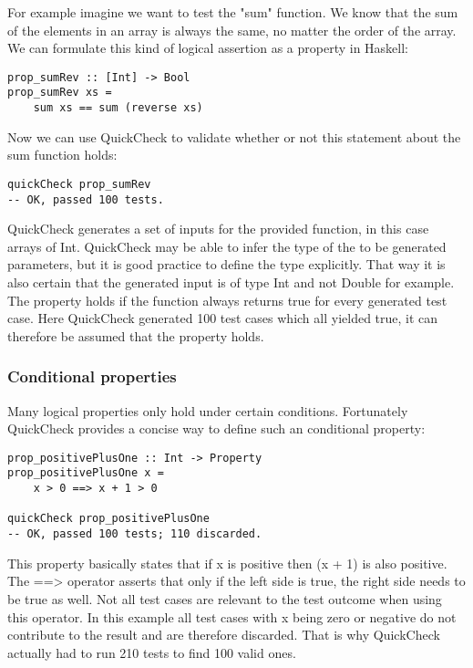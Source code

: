 \documentclass[a4paper, 12pt]{article} %
\begin{document}
For example imagine we want to test the "sum" function. We know that the sum of the elements in an array is always the same, no matter the order of the array. We can formulate this kind of logical assertion as a property in Haskell:

\begin{verbatim}
prop_sumRev :: [Int] -> Bool
prop_sumRev xs = 
    sum xs == sum (reverse xs)
\end{verbatim}

Now we can use QuickCheck to validate whether or not this statement about the sum function holds:

\begin{verbatim}
quickCheck prop_sumRev
-- OK, passed 100 tests.
\end{verbatim}

QuickCheck generates a set of inputs for the provided function, in this case arrays of Int. QuickCheck may be able to infer the type of the to be generated parameters, but it is good practice to define the type explicitly. That way it is also certain that the generated input is of type Int and not Double for example. The property holds if the function always returns true for every generated test case\cite{Claessen2000}. Here QuickCheck generated 100 test cases which all yielded true, it can therefore be assumed that the property holds.

\subsubsection{Conditional properties}

Many logical properties only hold under certain conditions. Fortunately QuickCheck provides a concise way to define such an conditional property:

\begin{verbatim}
prop_positivePlusOne :: Int -> Property
prop_positivePlusOne x = 
    x > 0 ==> x + 1 > 0

quickCheck prop_positivePlusOne  
-- OK, passed 100 tests; 110 discarded.
\end{verbatim}

This property basically states that if x is positive then (x + 1) is also positive. The ==\textgreater{} operator asserts that only if the left side is true, the right side needs to be true as well\cite{Claessen2000}. Not all test cases are relevant to the test outcome when using this operator. In this example all test cases with x being zero or negative do not contribute to the result and are therefore discarded. That is why QuickCheck actually had to run 210 tests to find 100 valid ones.  
\end{document}
